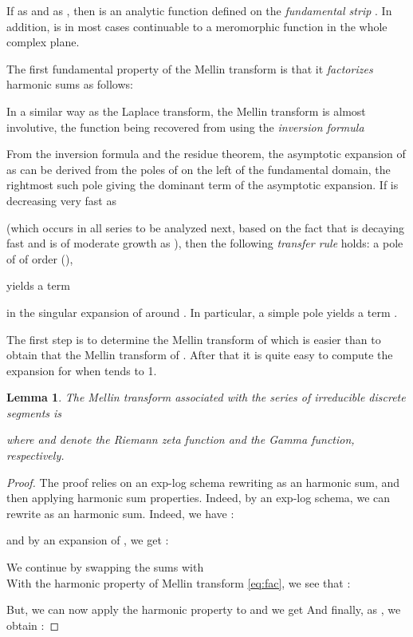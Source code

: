 \documentclass{article}
\newtheorem{lemma}[theorem]{Lemma}
\begin{document}
If  as  and  as
, then  is an analytic function defined on the
\emph{fundamental strip} . In addition, 
is in most cases continuable to a meromorphic function in the whole
complex plane.

The first fundamental property of the Mellin transform is that
it \emph{factorizes} harmonic sums as follows:


In a similar way as the Laplace transform, the Mellin transform is almost involutive,
the function  being recovered from  using the
\emph{inversion formula}

From the inversion formula and the residue theorem, the asymptotic expansion of  as 
can be derived from the poles of  on the left of the fundamental
domain, the rightmost such pole giving the dominant term of the asymptotic
expansion. If  is decreasing very fast as

 (which occurs in all series to be analyzed next, based on the
fact that  is decaying fast and  is of
moderate growth as ), then the
following \emph{transfer rule} holds: a pole of  of
order  (),

yields a term

in the singular expansion of  around .
In particular, a simple pole  yields
a term .

The first step is to determine the Mellin transform of
 which is easier than to obtain that the
Mellin transform of . After that it is quite easy to compute the expansion for  when  tends to 1.
\begin{lemma}
\label{pouranne}
The Mellin transform associated with the
series of irreducible discrete segments is
  
 where  and  denote the Riemann zeta function and the Gamma function, respectively.
 \end{lemma}
 \begin{proof} 
 The proof relies on an exp-log schema rewriting  as an harmonic sum, and then applying harmonic sum properties.
Indeed, by an exp-log schema, we can rewrite  as an harmonic sum. Indeed, we have :
 
 and by an expansion of , we get :
  
  We continue by swapping the sums
  with \\
 With the harmonic property of Mellin transform \ref{eq:fac}, we see that :
 
 But, we can now apply the harmonic property to  and we get 
And finally, as , we obtain :
  

   \end{proof}
\end{document}

